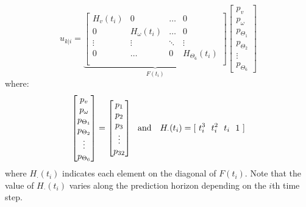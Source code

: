 \begin{equation}
{u}_{k|i}=\underbrace{\left[ \begin{matrix}
H_v(t_i)          & 0 & \dots      & 0  \\
0 &     H_\omega(t_i)      & \dots      & 0  \\
\vdots     & \vdots     & \ddots     & \vdots      \\
0 & \dots      & 0 &   H_{\Theta_6}(t_i)         \\
\end{matrix} \right]}_{F(t_i)} \left[ \begin{matrix} p_v \\ p_{\omega} \\ p_{\Theta_1} \\ p_{\Theta_2} \\ \vdots \\ p_{\Theta_6} \end{matrix} \right]
\end{equation}
where: 
\begin{equation}
\left[ \begin{matrix} p_v \\ p_{\omega} \\ {p}_{\Theta_1} \\ {p}_{\Theta_2} \\ \vdots \\ {p}_{\Theta_6} \end{matrix} \right] = \left[ \begin{matrix} p_1 \\ p_2 \\ p_3 \\ \vdots \\ p_{32} \end{matrix} \right]\ \ \textnormal{and }\ \ H_\cdot(t_i)=[\ t_i^3\ \ t_i^2\ \ t_i\ \ 1\ ]
\end{equation}
where $H_\cdot(t_i)$ indicates each element on the diagonal of $F(t_i)$. Note that the value of $H_\cdot(t_i)$ varies along the prediction horizon depending on the $i$th time step. 

